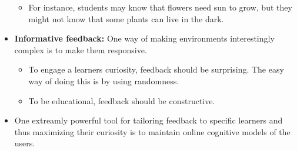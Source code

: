 \begin{itemize}
\begin{itemize}
          \item For instance, students may know that flowers need sun to grow, but they might not know that some plants can live in the dark. 
        \end{itemize}
        \item {\bf Informative feedback:} One way of making environments interestingly complex is to make them responsive.
          \begin{itemize}
            \item  To engage a learners curiosity, feedback should be surprising. The easy way of doing this is by using randomness. 
            \item To be educational, feedback should be constructive.  
          \end{itemize}
        \item One extreamly powerful tool for tailoring feedback to specific learners and thus maximizing their curiosity is to maintain online cognitive models of the users. 
    \end{itemize}
